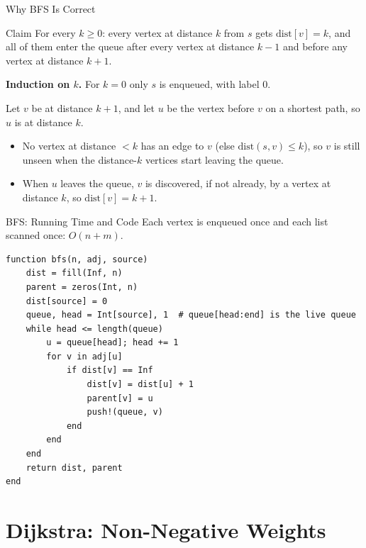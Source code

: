 \documentclass[10pt,aspectratio=169]{beamer}
\begin{document}
\begin{frame}{Why BFS Is Correct}
  \begin{block}{Claim}
    For every $k \ge 0$: every vertex at distance $k$ from $s$ gets
    $\text{dist}[v] = k$, and all of them enter the queue after every vertex
    at distance $k - 1$ and before any vertex at distance $k + 1$.
  \end{block}

  \pause
  \bigskip
  \textbf{Induction on $k$.} For $k = 0$ only $s$ is enqueued, with label $0$.

  \bigskip
  Let $v$ be at distance $k + 1$, and let $u$ be the vertex before $v$ on a
  shortest path, so $u$ is at distance $k$.
  \begin{itemize}
    \item No vertex at distance $< k$ has an edge to $v$ (else
          $\text{dist}(s,v) \le k$), so $v$ is still unseen when the distance-$k$
          vertices start leaving the queue.
    \item When $u$ leaves the queue, $v$ is discovered, if not already, by a
          vertex at distance $k$, so $\text{dist}[v] = k + 1$.
  \end{itemize}
\end{frame}

\begin{frame}[fragile]{BFS: Running Time and Code}
  Each vertex is enqueued once and each list scanned once: $O(n + m)$.

\begin{lstlisting}[basicstyle=\ttfamily\scriptsize]
function bfs(n, adj, source)
    dist = fill(Inf, n)
    parent = zeros(Int, n)
    dist[source] = 0
    queue, head = Int[source], 1  # queue[head:end] is the live queue
    while head <= length(queue)
        u = queue[head]; head += 1
        for v in adj[u]
            if dist[v] == Inf
                dist[v] = dist[u] + 1
                parent[v] = u
                push!(queue, v)
            end
        end
    end
    return dist, parent
end
\end{lstlisting}
\end{frame}

\section{Dijkstra: Non-Negative Weights}
\end{document}
